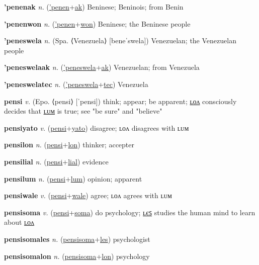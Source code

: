 \textbf{\hypertarget{'penenak}{'penenak}} \textit{n.} (\hyperlink{'penen}{'penen}+\allowbreak \hyperlink{ak}{ak})
Beninese; Beninois; from Benin

\textbf{\hypertarget{'penenwon}{'penenwon}} \textit{n.} (\hyperlink{'penen}{'penen}+\allowbreak \hyperlink{won}{won})
Beninese; the Beninese people

\textbf{\hypertarget{'peneswela}{'peneswela}} \textit{n.} (Spa. ⟨Venezuela⟩ [beneˈswela])
Venezuelan; the Venezuelan people

\textbf{\hypertarget{'peneswelaak}{'peneswelaak}} \textit{n.} (\hyperlink{'peneswela}{'peneswela}+\allowbreak \hyperlink{ak}{ak})
Venezuelan; from Venezuela

\textbf{\hypertarget{'peneswelatec}{'peneswelatec}} \textit{n.} (\hyperlink{'peneswela}{'peneswela}+\allowbreak \hyperlink{tec}{tec})
Venezuela

\textbf{\hypertarget{pensi}{pensi}} \textit{v.} (Epo. ⟨pensi⟩ [ˈpensi])
think; appear; be apparent; \hyperlink{pensilon}{ʟᴏᴧ} consciously decides that \hyperlink{pensilum}{ʟᴜᴍ} is true; see "be sure" and "believe"

\textbf{\hypertarget{pensiyato}{pensiyato}} \textit{v.} (\hyperlink{pensi}{pensi}+\allowbreak \hyperlink{yato}{yato})
disagree; ʟᴏᴧ disagrees with ʟᴜᴍ

\textbf{\hypertarget{pensilon}{pensilon}} \textit{n.} (\hyperlink{pensi}{pensi}+\allowbreak \hyperlink{lon}{lon})
thinker; accepter

\textbf{\hypertarget{pensilial}{pensilial}} \textit{n.} (\hyperlink{pensi}{pensi}+\allowbreak \hyperlink{lial}{lial})
evidence

\textbf{\hypertarget{pensilum}{pensilum}} \textit{n.} (\hyperlink{pensi}{pensi}+\allowbreak \hyperlink{lum}{lum})
opinion; apparent

\textbf{\hypertarget{pensiwale}{pensiwale}} \textit{v.} (\hyperlink{pensi}{pensi}+\allowbreak \hyperlink{wale}{wale})
agree; ʟᴏᴧ agrees with ʟᴜᴍ

\textbf{\hypertarget{pensisoma}{pensisoma}} \textit{v.} (\hyperlink{pensi}{pensi}+\allowbreak \hyperlink{soma}{soma})
do psychology; \hyperlink{pensisomales}{ʟєꜱ} studies the human mind to learn about \hyperlink{pensisomalon}{ʟᴏᴧ}

\textbf{\hypertarget{pensisomales}{pensisomales}} \textit{n.} (\hyperlink{pensisoma}{pensisoma}+\allowbreak \hyperlink{les}{les})
psychologist

\textbf{\hypertarget{pensisomalon}{pensisomalon}} \textit{n.} (\hyperlink{pensisoma}{pensisoma}+\allowbreak \hyperlink{lon}{lon})
psychology

